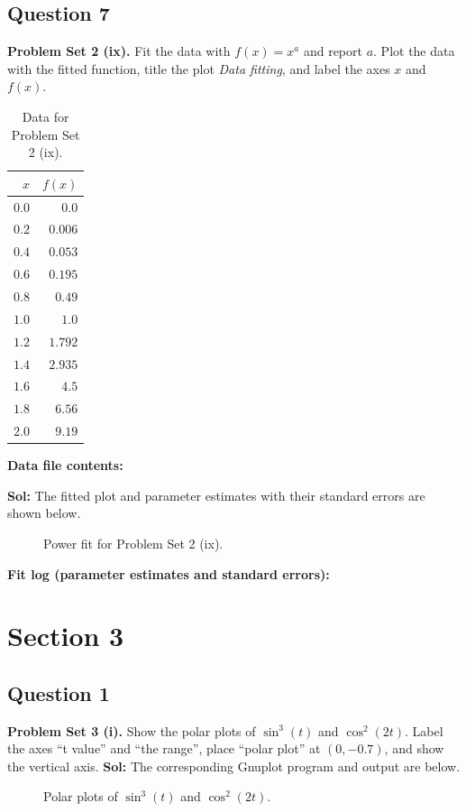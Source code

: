\documentclass{book}
\begin{document}
\subsection*{Question 7}
\noindent\textbf{Problem Set 2 (ix).} Fit the data with $f(x)=x^a$ and report $a$. Plot the data with the fitted function, title the plot \textit{Data fitting}, and label the axes $x$ and $f(x)$.
\begin{table}[H]
\centering
\caption{Data for Problem Set 2 (ix).}
\begin{tabular}{|r|r|}
\hline
$x$ & $f(x)$ \\ \hline
$0.0$ & $0.0$ \\ \hline
$0.2$ & $0.006$ \\ \hline
$0.4$ & $0.053$ \\ \hline
$0.6$ & $0.195$ \\ \hline
$0.8$ & $0.49$ \\ \hline
$1.0$ & $1.0$ \\ \hline
$1.2$ & $1.792$ \\ \hline
$1.4$ & $2.935$ \\ \hline
$1.6$ & $4.5$ \\ \hline
$1.8$ & $6.56$ \\ \hline
$2.0$ & $9.19$ \\ \hline
\end{tabular}
\end{table}
\noindent\textbf{Data file contents:}

\noindent\textbf{Sol:} The fitted plot and parameter estimates with their standard errors are shown below.

\begin{figure}[H]
    \centering
    
    \caption{Power fit for Problem Set 2 (ix).}
\end{figure}
\noindent\textbf{Fit log (parameter estimates and standard errors):}

\newpage
\section*{Section 3}

\subsection*{Question 1}
\noindent\textbf{Problem Set 3 (i).} Show the polar plots of $\sin^3(t)$ and $\cos^2(2t)$. Label the axes ``t value'' and ``the range'', place ``polar plot'' at $(0,-0.7)$, and show the vertical axis.
\noindent\textbf{Sol:} The corresponding Gnuplot program and output are below.

\begin{figure}[htbp]
    \centering
    
    \caption{Polar plots of $\sin^3(t)$ and $\cos^2(2t)$.}
\end{figure}
\end{document}
